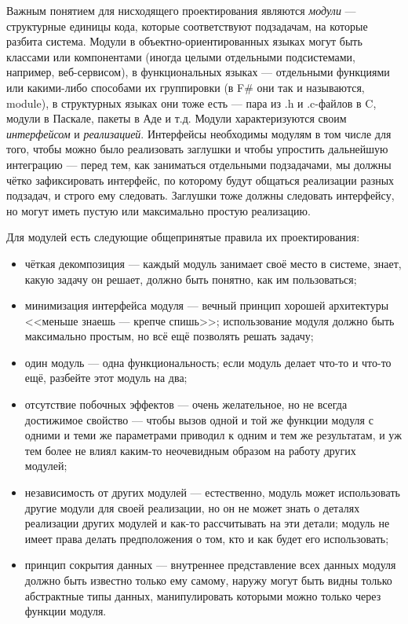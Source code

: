 \documentclass[a5paper]{article}
\begin{document}
Важным понятием для нисходящего проектирования являются \textit{модули} --- структурные единицы кода, которые соответствуют подзадачам, на которые разбита система. Модули в объектно-ориентированных языках могут быть классами или компонентами (иногда целыми отдельными подсистемами, например, веб-сервисом), в функциональных языках --- отдельными функциями или какими-либо способами их группировки (в F\# они так и называются, module), в структурных языках они тоже есть --- пара из .h и .c-файлов в C, модули в Паскале, пакеты в Аде и т.д. Модули характеризуются своим \textit{интерфейсом} и \textit{реализацией}. Интерфейсы необходимы модулям в том числе для того, чтобы можно было реализовать заглушки и чтобы упростить дальнейшую интеграцию --- перед тем, как заниматься отдельными подзадачами, мы должны чётко зафиксировать интерфейс, по которому будут общаться реализации разных подзадач, и строго ему следовать. Заглушки тоже должны следовать интерфейсу, но могут иметь пустую или максимально простую реализацию.

Для модулей есть следующие общепринятые правила их проектирования:

\begin{itemize}
    \item чёткая декомпозиция --- каждый модуль занимает своё место в системе, знает, какую задачу он решает, должно быть понятно, как им пользоваться;
    \item минимизация интерфейса модуля --- вечный принцип хорошей архитектуры <<меньше знаешь --- крепче спишь>>; использование модуля должно быть максимально простым, но всё ещё позволять решать задачу;
    \item один модуль --- одна функциональность; если модуль делает что-то и что-то ещё, разбейте этот модуль на два;
    \item отсутствие побочных эффектов --- очень желательное, но не всегда достижимое свойство --- чтобы вызов одной и той же функции модуля с одними и теми же параметрами приводил к одним и тем же результатам, и уж тем более не влиял каким-то неочевидным образом на работу других модулей;
    \item независимость от других модулей --- естественно, модуль может использовать другие модули для своей реализации, но он не может знать о деталях реализации других модулей и как-то рассчитывать на эти детали; модуль не имеет права делать предположения о том, кто и как будет его использовать;
    \item принцип сокрытия данных --- внутреннее представление всех данных модуля должно быть известно только ему самому, наружу могут быть видны только абстрактные типы данных, манипулировать которыми можно только через функции модуля.
\end{itemize}
\end{document}

